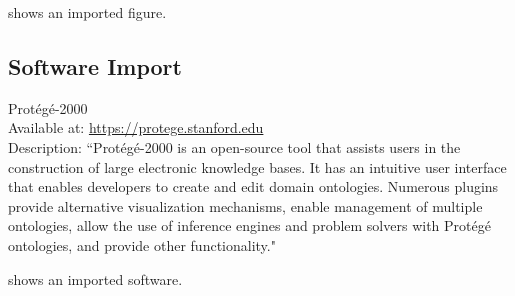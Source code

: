  shows an imported figure.

\subsection{Software Import}


\begin{software}
Prot{\'{e}}g{\'{e}}-2000~\cite{DBLP:conf/amia/NoyCFKTVM03}\\
Available at: \url{https://protege.stanford.edu}\\
Description: ``Prot\'{e}g\'{e}-2000 is an open-source tool that assists users in the construction of large electronic knowledge bases. It has an intuitive user interface that enables developers to create and edit domain ontologies. Numerous plugins provide alternative visualization mechanisms, enable management of multiple ontologies, allow the use of inference engines and problem solvers with Prot\'{e}g\'{e} ontologies, and provide other functionality."~\cite{DBLP:conf/amia/NoyCFKTVM03}
\label{software:protege}
\end{software}

 shows an imported software.



